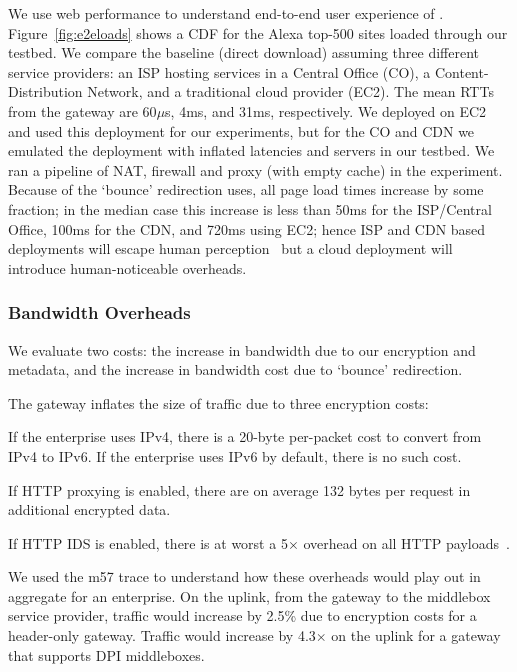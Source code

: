 We use web performance to understand end-to-end user experience of \sys.
Figure~\ref{fig:e2eloads} shows a CDF for the Alexa top-500 sites loaded through our testbed. We compare the baseline (direct download) assuming three different service providers: an ISP hosting services in a Central Office (CO), a Content-Distribution Network, and a traditional cloud provider (EC2). The mean RTTs from the gateway are 60$\mu$s, 4ms, and 31ms, respectively. We deployed \sys on EC2 and used this deployment for our experiments, but for the CO and CDN we emulated the deployment with inflated latencies and servers in our testbed. We ran a pipeline of NAT, firewall and proxy (with empty cache) in the experiment.
Because of the `bounce' redirection \sys uses, all page load times increase by some fraction; in the median case this increase is less than 50ms for the ISP/Central Office, 100ms for the CDN, and 720ms using EC2; hence ISP and CDN based deployments will escape human perception~\cite{millishumans} but a cloud deployment will introduce human-noticeable overheads.

\subsubsection{Bandwidth Overheads}
We evaluate two costs: the increase in bandwidth due to our encryption and metadata, and the increase in bandwidth cost due to `bounce' redirection.

The gateway inflates the size of traffic due to three encryption costs:
\begin{myitemize}
  \item If the enterprise uses IPv4, there is a 20-byte per-packet cost to convert from IPv4 to IPv6. If the enterprise uses IPv6 by default, there is no such cost.
  \item If HTTP proxying is enabled, there are on average 132 bytes per request in additional encrypted data.
  \item If HTTP IDS is enabled, there is at worst a 5$\times$ overhead on all HTTP payloads~\cite{blindbox}.
\end{myitemize}
We used the m57 trace to understand how these overheads would play out in aggregate for an enterprise.
On the uplink, from the gateway to the middlebox service provider, traffic would increase by 2.5\% due to encryption costs for a header-only gateway. Traffic would increase by 4.3$\times$ on the uplink for a gateway that supports DPI middleboxes. 

